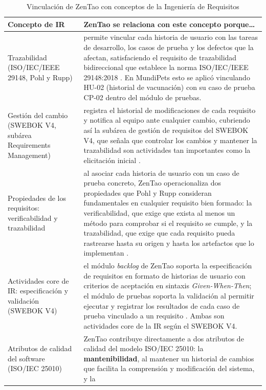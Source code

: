 \documentclass[journal,onecolumn]{IEEEtran}
\begin{document}
\begin{table}[H]
	\caption{Vinculación de ZenTao con conceptos de la Ingeniería de Requisitos}
	\label{tab:vinculacion-ir}
	\begin{tabularx}{\textwidth}{|l|X|}
		\hline
		\textbf{Concepto de IR} & \textbf{ZenTao se relaciona con este concepto porque\ldots} \\
		\hline
		Trazabilidad (ISO/IEC/IEEE 29148, Pohl y Rupp)
		& permite vincular cada historia de usuario con las tareas de desarrollo,
		los casos de prueba y los defectos que la afectan, satisfaciendo el requisito
		de trazabilidad bidireccional que establece la norma ISO/IEC/IEEE 29148:2018
		\cite{iso29148}. En MundiPets esto se aplicó vinculando HU-02 (historial de
		vacunación) con su caso de prueba CP-02 dentro del módulo de pruebas. \\
		\hline
		Gestión del cambio (SWEBOK V4, subárea Requirements Management)
		& registra el historial de modificaciones de cada requisito y notifica al equipo
		ante cualquier cambio, cubriendo así la subárea de gestión de requisitos del
		SWEBOK V4, que señala que controlar los cambios y mantener la trazabilidad son
		actividades tan importantes como la elicitación inicial \cite{swebok2024}. \\
		\hline
		Propiedades de los requisitos: verificabilidad y trazabilidad
		& al asociar cada historia de usuario con un caso de prueba concreto, ZenTao
		operacionaliza dos propiedades que Pohl y Rupp consideran fundamentales en
		cualquier requisito bien formado: la verificabilidad, que exige que exista al
		menos un método para comprobar si el requisito se cumple, y la trazabilidad,
		que exige que cada requisito pueda rastrearse hasta su origen y hasta los
		artefactos que lo implementan \cite{pohl2015}. \\
		\hline
		Actividades core de IR: especificación y validación (SWEBOK V4)
		& el módulo \textit{backlog} de ZenTao soporta la especificación de requisitos
		en formato de historias de usuario con criterios de aceptación en sintaxis
		\textit{Given-When-Then}; el módulo de pruebas soporta la validación al
		permitir ejecutar y registrar los resultados de cada caso de prueba vinculado
		a un requisito \cite{swebok2024}. Ambas son actividades core de la IR según
		el SWEBOK V4. \\
		\hline
		Atributos de calidad del software (ISO/IEC 25010)
		& ZenTao contribuye directamente a dos atributos de calidad del modelo
		ISO/IEC 25010: la \textbf{mantenibilidad}, al mantener un historial de cambios
		que facilita la comprensión y modificación del sistema, y la

\end{tabularx}
\end{table}
\end{document}
